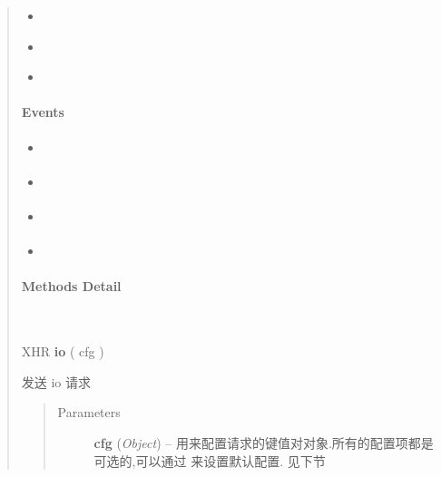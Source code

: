 \documentclass[letterpaper,10pt,english]{sphinxmanual}
\begin{document}
\begin{quote}
\begin{itemize}
\item {}
{\hyperref[api/core/ajax/io:io.cfg.type]{}}

\item {}
{\hyperref[api/core/ajax/io:io.cfg.xhrFields]{}}

\item {}
{\hyperref[api/core/ajax/io:io.cfg.form]{}}

\end{itemize}


\paragraph{Events}
\label{api/core/ajax/io:events}\begin{itemize}
\item {}
{\hyperref[api/core/ajax/io:io.start]{}}

\item {}
{\hyperref[api/core/ajax/io:io.send]{}}

\item {}
{\hyperref[api/core/ajax/io:io.success]{}}

\item {}
{\hyperref[api/core/ajax/io:io.error]{}}

\end{itemize}


\paragraph{Methods Detail}
\label{api/core/ajax/io:methods-detail}

\begin{fulllineitems}
\label{api/core/ajax/io:io.io}~
\begin{DUlineblock}{0em}
\item[] XHR \textbf{io} ( cfg )
\item[] 发送 io 请求
\end{DUlineblock}
\begin{quote}\begin{description}
\item[{Parameters}] \leavevmode
\textbf{cfg} (\emph{Object}) -- 用来配置请求的键值对对象.所有的配置项都是可选的,可以通过 {\hyperref[api/core/ajax/setupConfig:io.setupConfig]{}} 来设置默认配置. 见下节


\end{description}
\end{quote}
\end{fulllineitems}
\end{quote}
\end{document}
